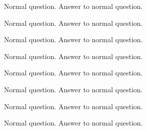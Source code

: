 \documentclass{../../flashcards}
\begin{document}
\begin{card}{Normal question.}
Answer to normal question.
\end{card}


\begin{card}{\blindtext[4]}
\blindtext[4]
\end{card}


\begin{card}{Normal question.}
Answer to normal question.
\end{card}


\begin{card}{\blindtext[4]}
\blindtext[4]
\end{card}


\begin{card}{Normal question.}
Answer to normal question.
\end{card}


\begin{card}{\blindtext[4]}
\blindtext[4]
\end{card}


\begin{card}{Normal question.}
Answer to normal question.
\end{card}


\begin{card}{\blindtext[4]}
\blindtext[4]
\end{card}


\begin{card}{Normal question.}
Answer to normal question.
\end{card}


\begin{card}{\blindtext[4]}
\blindtext[4]
\end{card}


\begin{card}{Normal question.}
Answer to normal question.
\end{card}


\begin{card}{\blindtext[4]}
\blindtext[4]
\end{card}


\begin{card}{Normal question.}
Answer to normal question.
\end{card}


\begin{card}{\blindtext[4]}
\blindtext[4]
\end{card}


\begin{card}{Normal question.}
Answer to normal question.
\end{card}
\end{document}
